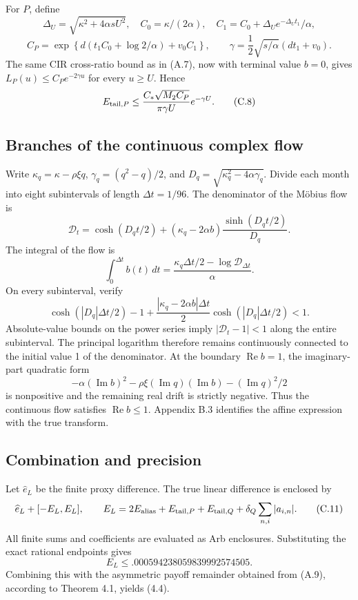 \documentclass[11pt,a4paper]{article}
\begin{document}
For \(P\), define
\[
\Delta_U=\sqrt{\kappa^2+4\alpha sU^2},\quad
C_0=\kappa/(2\alpha),\quad
C_1=C_0+\Delta_Ue^{-\Delta_Ut_1}/\alpha,
\]
\[
C_P=\exp\!\left\{
d(t_1C_0+\log2/\alpha)+v_0C_1\right\},\qquad
\gamma=\frac12\sqrt{s/\alpha}(dt_1+v_0).
\]
The same CIR cross-ratio bound as in (A.7), now with terminal value \(b=0\), gives \(L_P(u)\le C_Pe^{-2\gamma u}\) for every \(u\ge U\). Hence
\[
E_{{\rm tail},P}\le
\frac{C_*\sqrt{M_2C_P}}{\pi\gamma U}e^{-\gamma U}.
\tag{C.8}
\]

\subsection{Branches of the continuous complex flow}

Write \(\kappa_q=\kappa-\rho\xi q\), \(\gamma_q=(q^2-q)/2\), and \(D_q=\sqrt{\kappa_q^2-4\alpha\gamma_q}\). Divide each month into eight subintervals of length \(\Delta t=1/96\). The denominator of the M\"obius flow is
\[
\mathcal D_t=\cosh(D_qt/2)
+(\kappa_q-2\alpha b)\frac{\sinh(D_qt/2)}{D_q}.
\]
The integral of the flow is
\[
\int_0^{\Delta t}b(t)\,dt
=\frac{\kappa_q\Delta t/2-\log\mathcal D_{\Delta t}}{\alpha}.
\tag{C.9}
\]
On every subinterval, verify
\[
\cosh(|D_q|\Delta t/2)-1+
\frac{|\kappa_q-2\alpha b|\Delta t}{2}
\cosh(|D_q|\Delta t/2)<1.
\tag{C.10}
\]
Absolute-value bounds on the power series imply \(|\mathcal D_t-1|<1\) along the entire subinterval. The principal logarithm therefore remains continuously connected to the initial value 1 of the denominator. At the boundary \(\operatorname{Re}b=1\), the imaginary-part quadratic form
\[
-\alpha(\operatorname{Im}b)^2
-\rho\xi(\operatorname{Im}q)(\operatorname{Im}b)
-(\operatorname{Im}q)^2/2
\]
is nonpositive and the remaining real drift is strictly negative. Thus the continuous flow satisfies \(\operatorname{Re}b\le1\). Appendix B.3 identifies the affine expression with the true transform.

\subsection{Combination and precision}

Let \(\widehat e_L\) be the finite proxy difference. The true linear difference is enclosed by
\[
\widehat e_L+
[-E_L,E_L],\qquad
E_L=2E_{\rm alias}+E_{{\rm tail},P}
+E_{{\rm tail},Q}+\delta_Q\sum_{n,i}|a_{i,n}|.
\tag{C.11}
\]
All finite sums and coefficients are evaluated as Arb enclosures. Substituting the exact rational endpoints gives
\[
E_L\le.000594238059839992574505.
\]
Combining this with the asymmetric payoff remainder obtained from (A.9), according to Theorem 4.1, yields (4.4).
\end{document}
